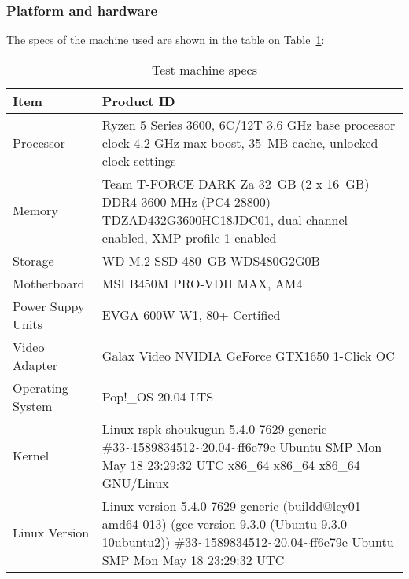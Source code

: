 \subsubsection{Platform and hardware}
The specs of the machine used are shown in the table on Table~\ref{TABLE:SPECS}:\\

\begin{table}[!ht]
    \centering
    \begin{tabularx}{\linewidth}{|l|X|}
        \hline
        Item & Product ID \\
        \hline
        Processor  & Ryzen 5 Series 3600, 6C/12T 3.6 GHz base processor clock 4.2 GHz max boost, 35 MB cache, unlocked clock settings \\
        \hline
        Memory  & Team T-FORCE DARK Za 32 GB (2 x 16 GB) DDR4 3600 MHz (PC4 28800) TDZAD432G3600HC18JDC01, dual-channel enabled, XMP profile 1 enabled\\
        \hline
        Storage  & WD M.2 SSD 480 GB WDS480G2G0B \\
        \hline
        Motherboard  & MSI B450M PRO-VDH MAX, AM4 \\
        \hline
        Power Suppy Units  & EVGA 600W W1, 80+ Certified\\
        \hline
        Video Adapter  &  Galax Video NVIDIA GeForce GTX1650 1-Click OC  \\
        \hline
        Operating System  &  Pop!\_OS 20.04 LTS  \\
        \hline
        Kernel  &  Linux rspk-shoukugun 5.4.0-7629-generic \#33\~{}1589834512\~{}20.04\~{}ff6e79e-Ubuntu SMP Mon May 18 23:29:32 UTC  x86\_64 x86\_64 x86\_64 GNU/Linux\\
        \hline
        Linux Version  & Linux version 5.4.0-7629-generic (buildd@lcy01-amd64-013) (gcc version 9.3.0 (Ubuntu 9.3.0-10ubuntu2)) \#33\~{}1589834512\~{}20.04\~{}ff6e79e-Ubuntu SMP Mon May 18 23:29:32 UTC \\ 
        \hline
    \end{tabularx}    
    \caption{Test machine specs}
    \label{TABLE:SPECS}
\end{table}
\FloatBarrier